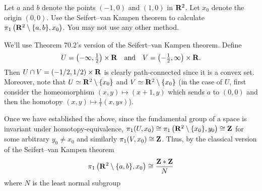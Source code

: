 \begin{problem}
  Let $a$ and $b$ denote the points $(-1,0)$ and $(1,0)$ in $\mathbf{R}^2$. Let
  $x_0$ denote the origin $(0,0)$. Use the Seifert--van Kampen theorem to
  calculate $\pi_1\left(\mathbf{R}^2\setminus\{a,b\},x_0\right)$. You may
  not use any other method.
\end{problem}
\begin{solution}
  We'll use Theorem 70.2's version of the Seifert--van Kampen
  theorem. Define
  \[
    U=\left(-\infty,\tfrac{1}{2}\right)\times\mathbf{R} \quad\text{and}\quad
    V=\left(-\tfrac{1}{2},\infty\right)\times\mathbf{R}.
  \]
  Then $U\cap V=(-1/2,1/2)\times\mathbf{R}$ is clearly path-connected since it is
  a convex set. Moreover, note that $U\simeq\mathbf{R}^2\setminus\{x_0\}$
  and $V\simeq\mathbf{R}^2\setminus\{x_0\}$ (in the case of $U$, first
  consider the homeomorphism $(x,y)\mapsto(x+1,y)$ which sends $a$ to
  $(0,0)$ and then the homotopy $(x,y)\mapsto\tfrac{1}{t}(x,ys)$).

  Once we have established the above, since the fundamental group of a
  space is invariant under homotopy-equivalence,
  $\pi_1(U,x_0)\cong\pi_1\left(\mathbf{R}^2\setminus\{x_0\},y_0\right)\cong\mathbf{Z}$
  for some arbitrary $y_0\neq x_0$ and similarly
  $\pi_1(V,x_0)\cong\mathbf{Z}$. Thus, by the classical version of the
  Seifert--van Kampen theorem
  \[
    \pi_1\left(\mathbf{R}^2\setminus\{a,b\},x_0\right)\cong
    \frac{\mathbf{Z}*\mathbf{Z}}{N}
  \]
  where $N$ is the least normal subgroup
\end{solution}


